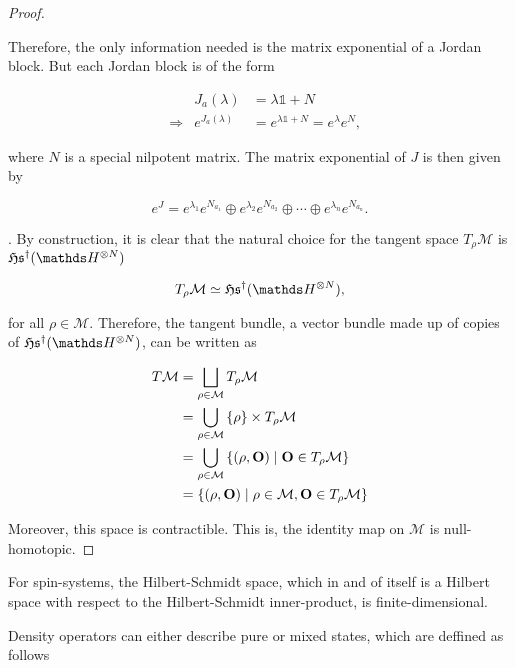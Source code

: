 \documentclass{homework}
\begin{document}
\begin{proof}
{\begin{tcolorbox}[title = Alternative proof of surjective-ness of the exponential map onto the general linear group]
Therefore, the only information needed is the matrix exponential of a Jordan block. But each Jordan block is of the form 

$$
{\begin{aligned}&&J_{a}(\lambda )&=\lambda \mathds{1}+N\\&\Rightarrow &e^{J_{a}(\lambda )}&=e^{\lambda \mathds{1}+N}=e^{\lambda }e^{N},\end{aligned}}
$$

where $N$ is a special nilpotent matrix. The matrix exponential of $J$ is then given by

$$
e^{J}=e^{\lambda _{1}}e^{N_{a_{1}}}\oplus e^{\lambda _{2}}e^{N_{a_{2}}}\oplus \cdots \oplus e^{\lambda _{n}}e^{N_{a_{n}}}.
$$
\end{tcolorbox}}. By construction, it is clear that the natural choice for the 
tangent space $T_\rho \mathcal{M}$ is $\mathfrak{H}\mathfrak{s}^{\dagger}(\hilbert^{\otimes N})$

$$
    T_\rho \mathcal{M} \simeq \mathfrak{H}\mathfrak{s}^{\dagger}(\hilbert^{\otimes N}),
$$

for all $\rho \in \mathcal{M}$. Therefore, the tangent bundle, a vector bundle made up of copies of $\mathfrak{H}\mathfrak{s}^{\dagger}(\hilbert^{\otimes N})$, can be written as 

$$
    {\displaystyle {\begin{aligned}T\mathcal{M}&=\bigsqcup _{\rho \in \mathcal{M}}T_{\rho}\mathcal{M}\\&=\bigcup _{\rho\in \mathcal{M}}\left\{\rho\right\}\times T_{\rho}\mathcal{M}\\&=\bigcup_{\rho\in \mathcal{M}}\left\{(\rho,{\bf O})\mid {\bf O}\in T_{\rho} \mathcal{M}\right\}\\&=\left\{(\rho,{\bf O})\mid \rho\in \mathcal{M},{\bf O}\in T_{\rho} \mathcal{M}\right\}\end{aligned}}}
$$

Moreover, this space is contractible. This is, the identity map on $\mathcal{M}$ is null-homotopic.  

\end{proof}

\clearpage 

For spin-systems, the Hilbert-Schmidt space, which in and of itself is a Hilbert space with respect to the Hilbert-Schmidt inner-product, is finite-dimensional. 

\clearpage

Density operators can either describe pure or mixed states, which are deffined as follows 
\end{document}
